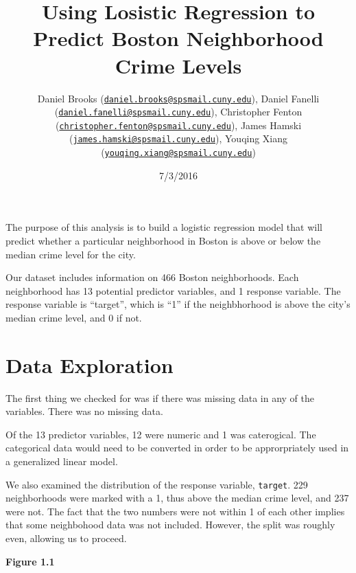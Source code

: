 \documentclass[]{article}
\title{Using Losistic Regression to Predict Boston Neighborhood Crime Levels}
\author{Daniel Brooks
(\href{mailto:daniel.brooks@spsmail.cuny.edu}{\nolinkurl{daniel.brooks@spsmail.cuny.edu}}),
Daniel Fanelli
(\href{mailto:daniel.fanelli@spsmail.cuny.edu}{\nolinkurl{daniel.fanelli@spsmail.cuny.edu}}),
Christopher Fenton
(\href{mailto:christopher.fenton@spsmail.cuny.edu}{\nolinkurl{christopher.fenton@spsmail.cuny.edu}}),
James Hamski
(\href{mailto:james.hamski@spsmail.cuny.edu}{\nolinkurl{james.hamski@spsmail.cuny.edu}}),
Youqing Xiang
(\href{mailto:youqing.xiang@spsmail.cuny.edu}{\nolinkurl{youqing.xiang@spsmail.cuny.edu}})}
\date{7/3/2016}
\begin{document}
\maketitle


The purpose of this analysis is to build a logistic regression model
that will predict whether a particular neighborhood in Boston is above
or below the median crime level for the city.

Our dataset includes information on 466 Boston neighborhoods. Each
neighborhood has 13 potential predictor variables, and 1 response
variable. The response variable is ``target'', which is ``1'' if the
neighbhorhood is above the city's median crime level, and 0 if not.

\section{Data Exploration}\label{data-exploration}

The first thing we checked for was if there was missing data in any of
the variables. There was no missing data.

Of the 13 predictor variables, 12 were numeric and 1 was caterogical.
The categorical data would need to be converted in order to be
approrpriately used in a generalized linear model.

We also examined the distribution of the response variable,
\texttt{target}. 229 neighborhoods were marked with a 1, thus above the
median crime level, and 237 were not. The fact that the two numbers were
not within 1 of each other implies that some neighbohood data was not
included. However, the split was roughly even, allowing us to proceed.

\textbf{Figure 1.1}
\end{document}
